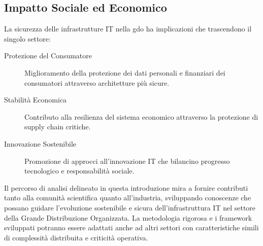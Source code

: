 \subsection{Impatto Sociale ed Economico}
\label{subsec:impatto-sociale-economico}

La sicurezza delle infrastrutture IT nella \gls{gdo} ha implicazioni che trascendono il singolo settore:

\begin{description}
    \item[Protezione del Consumatore] Miglioramento della protezione dei dati personali e finanziari dei consumatori attraverso architetture più sicure.
    
    \item[Stabilità Economica] Contributo alla resilienza del sistema economico attraverso la protezione di supply chain critiche.
    
    \item[Innovazione Sostenibile] Promozione di approcci all'innovazione IT che bilancino progresso tecnologico e responsabilità sociale.
\end{description}

\vspace{1cm}

Il percorso di analisi delineato in questa introduzione mira a fornire contributi tanto alla comunità scientifica quanto all'industria, sviluppando conoscenze che possano guidare l'evoluzione sostenibile e sicura dell'infrastruttura IT nel settore della Grande Distribuzione Organizzata. La metodologia rigorosa e i framework sviluppati potranno essere adattati anche ad altri settori con caratteristiche simili di complessità distribuita e criticità operativa.
